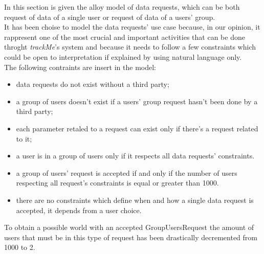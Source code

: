 In this section is given the alloy model of data requests, which can be both request of data of a single user or request of data of a users' group.\\
It has been choise to model the data requests' use case because, in our opinion, it rappresent one of the most crucial and important activities that can be done throght \textit{trackMe}'s system and because it needs to follow a few constraints which could be open to interpretation if explained by using natural language only.\\
The following contraints are insert in the model:\\
\begin{itemize}
	\item data requests do not exist without a third party;
	\item a group of users doesn't exist if a users’ group request hasn't been done by a third party;
	\item each parameter retaled to a request can exist only if there's a request related to it;
	\item a user is in a group of users only if it respects all data requests' constraints.
	\item a group of users' request is accepted if and only if the number of users respecting all request's constraints is equal or 			greater than 1000.
	\item there are no constraints which define when and how a single data request is accepted, it depends from a user choice.
\end{itemize}To obtain a possible world with an accepted GroupUsersRequest  the amount of users that must be in this type of request has been drastically decremented from 1000 to 2.

